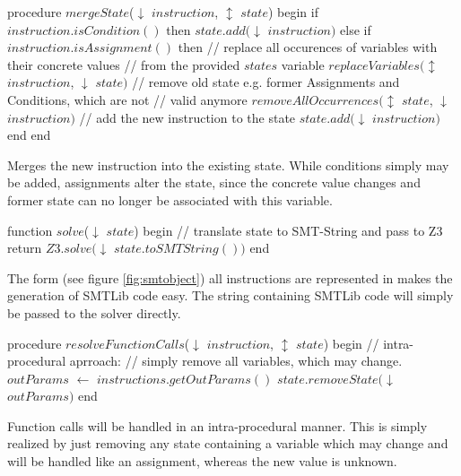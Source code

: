 \begin{program}
	\begin{GenericCode}
procedure $mergeState$($\downarrow$ $instruction$, $\updownarrow$ $state$) begin
	if $instruction.isCondition()$ then
		$state.add($$\downarrow$ $instruction$$)$
	else if $instruction.isAssignment()$ then
		// replace all occurences of variables with their concrete values
		// from the provided $states$ variable
		$replaceVariables($$\updownarrow$ $instruction$, $\downarrow$ $state$$)$ 
		// remove old state e.g. former Assignments and Conditions, which are not
		// valid anymore
		$removeAllOccurrences($$\updownarrow$ $state$, $\downarrow$ $instruction$$)$
		// add the new instruction to the state
		$state.add($$\downarrow$ $instruction$$)$
	end 
end	\end{GenericCode}
	\caption{Merges the new instruction into the existing state. While conditions simply may be added, assignments alter the state, since the concrete value changes and former state can no longer be associated with this variable. }
\label{code:merge state}
\end{program}
\begin{program}
	\begin{GenericCode}
function $solve$($\downarrow$ $state$) begin
	// translate state to SMT-String and pass to Z3
	return $Z3.solve($$\downarrow$ $state.toSMTString())$
end\end{GenericCode}
	\caption{The form (see figure \ref{fig:smtobject}) all instructions are represented in makes the generation of SMTLib code easy. The string containing SMTLib code will simply be passed to the solver directly.}
\label{code:z3 solver}
\end{program}
\begin{program}
	\begin{GenericCode}
procedure $resolveFunctionCalls$($\downarrow$ $instruction$, $\updownarrow$ $state$) begin
	// intra-procedural aprroach:
	// simply remove all variables, which may change.
	$outParams$ $\leftarrow$ $instructions.getOutParams()$
	$state.removeState($$\downarrow$ $outParams$$)$
end	\end{GenericCode}
	\caption{Function calls will be handled in an intra-procedural manner. This is simply realized by just removing any state containing a variable which may change and will be handled like an assignment, whereas the new value is unknown. }
	\label{code:intraprocedural analysis}
\end{program}
